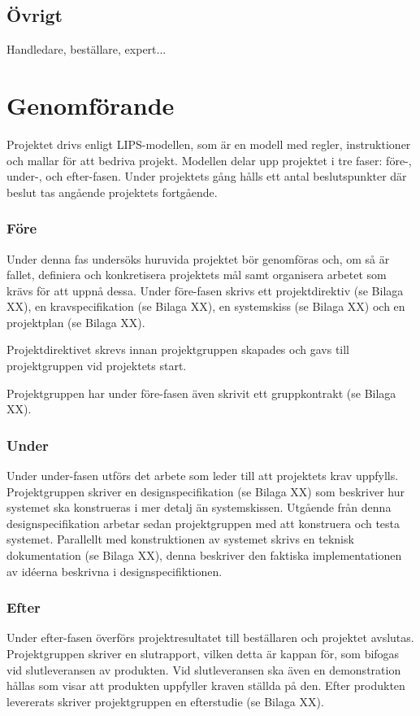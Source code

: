 \documentclass[a4paper,12pt]{article}
\begin{document}
\subsection{Övrigt}
Handledare, beställare, expert...

\section{Genomförande}
\label{ch:genomforande}
Projektet drivs enligt LIPS-modellen, som är en modell med regler, instruktioner och mallar för att bedriva projekt. Modellen delar upp projektet i tre faser: före-, under-, och efter-fasen. Under projektets gång hålls ett antal beslutspunkter där beslut tas angående projektets fortgående.
\subsubsection{Före}
Under denna fas undersöks huruvida projektet bör genomföras och, om så är fallet, definiera och konkretisera projektets mål samt organisera arbetet som krävs för att uppnå dessa. Under före-fasen skrivs ett projektdirektiv (se Bilaga XX), en kravspecifikation (se Bilaga XX), en systemskiss (se Bilaga XX) och en projektplan (se Bilaga XX). 

Projektdirektivet skrevs innan projektgruppen skapades och gavs till projektgruppen vid projektets start.

Projektgruppen har under före-fasen även skrivit ett gruppkontrakt (se Bilaga XX).
\subsubsection{Under}
Under under-fasen utförs det arbete som leder till att projektets krav uppfylls. Projektgruppen skriver en designspecifikation (se Bilaga XX) som beskriver hur systemet ska konstrueras i mer detalj än systemskissen.  Utgående från denna designspecifikation arbetar sedan projektgruppen med att konstruera och testa systemet. Parallellt med konstruktionen av systemet skrivs en teknisk dokumentation (se Bilaga XX), denna beskriver den faktiska implementationen av idéerna beskrivna i designspecifiktionen. 
\subsubsection{Efter}
Under efter-fasen överförs projektresultatet till beställaren och projektet avslutas. Projektgruppen skriver en slutrapport, vilken detta är kappan för, som bifogas vid slutleveransen av produkten. Vid slutleveransen ska även en demonstration hållas som visar att produkten uppfyller kraven ställda på den. Efter produkten levererats skriver projektgruppen en efterstudie (se Bilaga XX).
\end{document}

